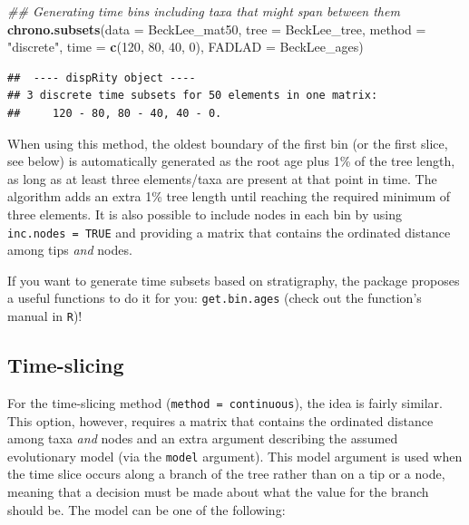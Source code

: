 \documentclass[]{book}
\newenvironment{Shaded}{\begin{snugshade}}{\end{snugshade}}
\newcommand{\CommentTok}[1]{\textcolor[rgb]{0.56,0.35,0.01}{\textit{#1}}}
\newcommand{\DataTypeTok}[1]{\textcolor[rgb]{0.13,0.29,0.53}{#1}}
\newcommand{\DecValTok}[1]{\textcolor[rgb]{0.00,0.00,0.81}{#1}}
\newcommand{\KeywordTok}[1]{\textcolor[rgb]{0.13,0.29,0.53}{\textbf{#1}}}
\newcommand{\NormalTok}[1]{#1}
\newcommand{\StringTok}[1]{\textcolor[rgb]{0.31,0.60,0.02}{#1}}
\begin{document}
\begin{Shaded}
\begin{Highlighting}[]
\CommentTok{## Generating time bins including taxa that might span between them}
\KeywordTok{chrono.subsets}\NormalTok{(}\DataTypeTok{data =}\NormalTok{ BeckLee_mat50, }\DataTypeTok{tree =}\NormalTok{ BeckLee_tree,}
               \DataTypeTok{method =} \StringTok{"discrete"}\NormalTok{,}
               \DataTypeTok{time =} \KeywordTok{c}\NormalTok{(}\DecValTok{120}\NormalTok{, }\DecValTok{80}\NormalTok{, }\DecValTok{40}\NormalTok{, }\DecValTok{0}\NormalTok{), }\DataTypeTok{FADLAD =}\NormalTok{ BeckLee_ages)}
\end{Highlighting}
\end{Shaded}

\begin{verbatim}
##  ---- dispRity object ---- 
## 3 discrete time subsets for 50 elements in one matrix:
##     120 - 80, 80 - 40, 40 - 0.
\end{verbatim}

When using this method, the oldest boundary of the first bin (or the first slice, see below) is automatically generated as the root age plus 1\% of the tree length, as long as at least three elements/taxa are present at that point in time.
The algorithm adds an extra 1\% tree length until reaching the required minimum of three elements.
It is also possible to include nodes in each bin by using \texttt{inc.nodes\ =\ TRUE} and providing a matrix that contains the ordinated distance among tips \emph{and} nodes.

If you want to generate time subsets based on stratigraphy, the package proposes a useful functions to do it for you: \texttt{get.bin.ages} (check out the function's manual in \texttt{R})!

\hypertarget{time-slicing}{%
\subsection{Time-slicing}\label{time-slicing}}

For the time-slicing method (\texttt{method\ =\ continuous}), the idea is fairly similar.
This option, however, requires a matrix that contains the ordinated distance among taxa \emph{and} nodes and an extra argument describing the assumed evolutionary model (via the \texttt{model} argument).
This model argument is used when the time slice occurs along a branch of the tree rather than on a tip or a node, meaning that a decision must be made about what the value for the branch should be.
The model can be one of the following:
\end{document}
